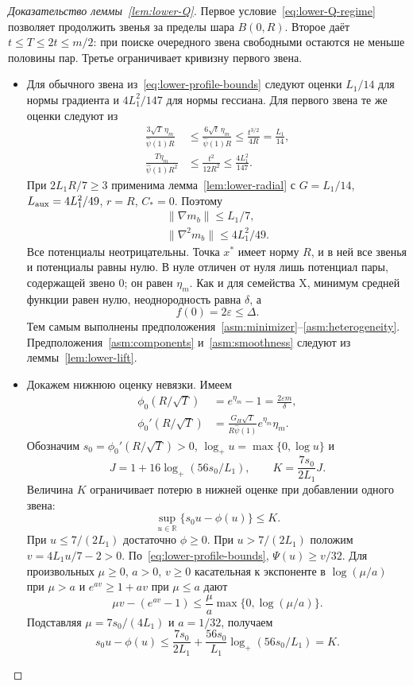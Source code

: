 \begin{proof}[Доказательство леммы~\ref{lem:lower-Q}]
Первое условие~\eqref{eq:lower-Q-regime} позволяет продолжить звенья
за пределы шара $B(0,R)$. Второе даёт $t\le T\le2t\le m/2$:
при поиске очередного звена свободными остаются не меньше половины пар.
Третье ограничивает кривизну первого звена.
\begin{itemize}
\item Для обычного звена из~\eqref{eq:lower-profile-bounds} следуют оценки
$L_1/14$ для нормы градиента и $4L_1^2/147$ для нормы гессиана.
Для первого звена те же оценки следуют из
\[
 \begin{aligned}
 \frac{3\sqrt T\,\eta_m}{\widehat\psi(1)R}
 &\le\frac{6\sqrt t\,\eta_m}{\widehat\psi(1)R}
 \le\frac{t^{3/2}}{4R}=\frac{L_1}{14},\\
 \frac{T\eta_m}{\widehat\psi(1)R^2}
 &\le\frac{t^2}{12R^2}\le\frac{4L_1^2}{147}.
 \end{aligned}
\]
При $2L_1R/7\ge3$ применима лемма~\ref{lem:lower-radial}
с $G=L_1/14$, $L_{\rm aux}=4L_1^2/49$, $r=R$, $C_\ast=0$.
Поэтому
\[
 \begin{gathered}
 \|\nabla m_b\|\le L_1/7,\\
 \|\nabla^2m_b\|\le4L_1^2/49.
 \end{gathered}
\]
Все потенциалы неотрицательны. Точка $x^\ast$ имеет норму $R$,
и в ней все звенья и потенциалы равны нулю.
В нуле отличен от нуля лишь потенциал пары, содержащей звено $0$; он равен
 $\eta_m$.
Как и для семейства X, минимум средней функции равен
нулю, неоднородность равна $\delta$, а
\[
 f(0)=2\varepsilon\le\Delta.
\]
Тем самым выполнены предположения~\ref{asm:minimizer}--\ref{asm:heterogeneity}.
Предположения~\ref{asm:components} и~\ref{asm:smoothness}
следуют из леммы~\ref{lem:lower-lift}.

\item Докажем нижнюю оценку невязки. Имеем
\[
 \begin{aligned}
 \phi_0(R/\sqrt T)&=e^{\eta_m}-1=\frac{2\varepsilon m}{\delta},\\
 \phi_0'(R/\sqrt T)&=
 \frac{G_H\sqrt T}{R\widehat\psi(1)}e^{\eta_m}\eta_m.
 \end{aligned}
\]
Обозначим $s_0=\phi_0'(R/\sqrt T)>0$,
$\log_+u=\max\{0,\log u\}$ и
\[
 J=1+16\log_+(56s_0/L_1),\qquad K=\frac{7s_0}{2L_1}J.
\]
Величина $K$ ограничивает потерю в нижней оценке при добавлении одного звена:
\begin{equation}\label{eq:lower-conjugate}
 \sup_{u\in\mathbb R}\{s_0u-\phi(u)\}\le K.
\end{equation}
При $u\le7/(2L_1)$ достаточно $\phi\ge0$.
При $u>7/(2L_1)$ положим $v=4L_1u/7-2>0$.
По~\eqref{eq:lower-profile-bounds}, $\Psi(u)\ge v/32$.
Для произвольных $\mu\ge0$, $a>0$, $v\ge0$ касательная к экспоненте в
$\log(\mu/a)$ при $\mu>a$ и $e^{av}\ge1+av$ при $\mu\le a$ дают
\[
 \mu v-(e^{av}-1)\le\frac\mu a\max\{0,\log(\mu/a)\}.
\]
Подставляя $\mu=7s_0/(4L_1)$ и $a=1/32$, получаем
\[
 s_0u-\phi(u)
 \le\frac{7s_0}{2L_1}
     +\frac{56s_0}{L_1}\log_+(56s_0/L_1)=K.
\]


\end{itemize}
\end{proof}
